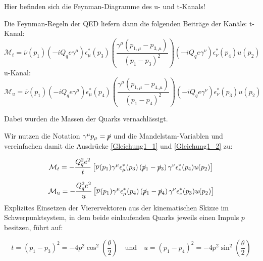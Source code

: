 Hier befinden sich die Feynman-Diagramme des u- und t-Kanals!

Die Feynman-Regeln der QED liefern dann die folgenden Beiträge der Kanäle:
t-Kanal:
\begin{equation}
 \mathcal{M}_t = \overline{\nu}\left(p_1\right) \left(-iQ_qe\gamma^\mu\right) \epsilon^*_\mu\left(p_3\right) \left(\frac{\gamma^\mu \left(p_{1,\mu} - p_{3, \mu}\right)}{\left(p_1 - p_3\right)^2}\right) \left(-iQ_qe\gamma^\nu\right) \epsilon^*_\nu\left(p_4\right) u\left( p_2\right)
 \label{Gleichung1_1}
\end{equation}
u-Kanal:
\begin{equation}
	 \mathcal{M}_u = \overline{\nu}\left(p_1\right) \left(-iQ_qe\gamma^\mu\right) \epsilon^*_\mu\left(p_4\right) \left(\frac{\gamma^\mu \left(p_{1,\mu} - p_{4, \mu}\right)}{\left(p_1 - p_4\right)^2}\right) \left(-iQ_qe\gamma^\nu\right) \epsilon^*_\nu\left(p_3\right) u\left( p_2\right)
	 \label{Gleichung1_2}
\end{equation}

Dabei wurden die Massen der Quarks vernachlässigt.

Wir nutzen die Notation $\gamma^\mu p_\mu = \cancel{p}$ und die Mandelstam-Variablen  und vereinfachen damit die Ausdrücke \autoref{Gleichung1_1} und \autoref{Gleichung1_2} zu:

\begin{equation}
\mathcal{M}_t = -\frac{Q_q^2e^2}{t}\left[ \overline{\nu}(p_1) \gamma^\mu \epsilon^*_\mu(p_3) \left(\cancel{p}_1 - \cancel{p}_3\right) \gamma^\nu \epsilon^*_\nu(p_4) u(p_2)\right] 
\end{equation}

\begin{equation}
	\mathcal{M}_u = -\frac{Q_q^2e^2}{u}\left[ \overline{\nu}(p_1) \gamma^\mu \epsilon^*_\mu(p_4) \left(\cancel{p}_1 - \cancel{p}_4\right) \gamma^\nu \epsilon^*_\nu(p_3) u(p_2)\right]
\end{equation}
Explizites Einsetzen der Vierervektoren aus der kinematischen Skizze im Schwerpunktsystem, in dem beide einlaufenden Quarks jeweils einen Impuls $p$ besitzen, führt auf:

\begin{equation}
	t = \left(p_1 -p_3\right)^2 = -4 p^2 \cos^2\left(\frac{\theta}{2}\right) \quad \text{und} \quad u = (p_1-p_4)^2 = -4p^2 \sin^2\left(\frac{\theta}{2}\right)
\end{equation} 

